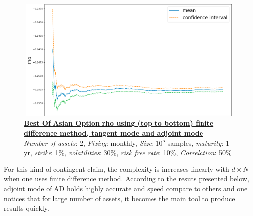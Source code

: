 \documentclass {article}
\begin{document}
			\begin{center}
				\begin{figure}[!h]
					\centering
				            \includegraphics[width=15cm, height=6cm]{bestOfAsianOptionAdjointModeRho.png}
							\caption{\textbf{\underline{Best Of Asian Option rho using (top to bottom) finite difference method, tangent mode and adjoint mode}} 
							\\ \textit{Number of assets}: 2, \textit{Fixing}: monthly, \textit{Size}: $10^{5}$ samples, \textit{maturity}: 1 yr, \textit{strike}: 1\%, \textit{volatilities}: 30\%, \textit{risk free rate}: 10\%, \textit{Correlation}: 50\%}
				\end{figure}
			\end{center}

			\newpage

			For this kind of contingent claim, the complexity is increases linearly with $d \times N$
			when one uses finite difference method. According to the resuts presented below, adjoint mode of AD 
			holds highly accurate and speed compare to others and one notices that for large number of assets, it becomes
			the main tool to produce results quickly. 
\end{document}
